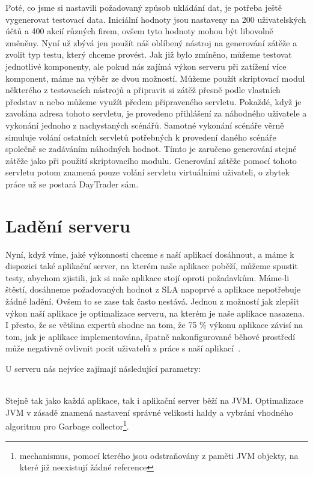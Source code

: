 \documentclass[122pt,oneside]{fithesis}
\begin{document}
Poté, co jsme si nastavili požadovaný způsob ukládání dat, je potřeba ještě vygenerovat testovací data. Iniciální hodnoty jsou nastaveny na 200 uživatelských účtů a 400 akcií různých firem, ovšem tyto hodnoty mohou být libovolně změněny. Nyní už zbývá jen použít náš oblíbený nástroj na generování zátěže a zvolit typ testu, který chceme provést. Jak již bylo zmíněno, můžeme testovat jednotlivé komponenty, ale pokud nás zajímá výkon serveru při zatížení více komponent, máme na výběr ze dvou možností. Můžeme použít skriptovací modul některého z testovacích nástrojů a připravit si zátěž přesně podle vlastních představ a nebo můžeme využít předem připraveného servletu. Pokaždé, když je zavolána adresa tohoto servletu, je provedeno přihlášení za náhodného uživatele a vykonání jednoho z nachystaných scénářů. Samotné vykonání scénáře věrně simuluje volání ostatních servletů potřebných k provedení daného scénáře společně se zadáváním náhodných hodnot. Tímto je zaručeno generování stejné zátěže jako při použití skriptovacího modulu. Generování zátěže pomocí tohoto servletu potom znamená pouze volání servletu virtuálními uživateli, o zbytek práce už se postará DayTrader sám.

\section{Ladění serveru}
Nyní, když víme, jaké výkonnosti chceme s naší aplikací dosáhnout, a máme k dispozici také aplikační server, na kterém naše aplikace poběží, můžeme spustit testy, abychom zjistili, jak si naše aplikace stojí oproti požadavkům. Máme-li štěstí, dosáhneme požadovaných hodnot z SLA napoprvé a aplikace nepotřebuje žádné ladění. Ovšem to se zase tak často nestává. Jednou z možností jak zlepšit výkon naší aplikace je optimalizace serveru, na kterém je naše aplikace nasazena. I přesto, že se většina expertů shodne na tom, že 75 \% výkonu aplikace závisí na tom, jak je aplikace implementována, špatně nakonfigurované běhové prostředí může negativně ovlivnit pocit uživatelů z práce s naší aplikací~\cite{performanceTuning}. 

U serveru nás nejvíce zajímají následující parametry:

\vspace{5 mm}
\\\indent Stejně tak jako každá aplikace, tak i aplikační server běží na JVM. Optimalizace JVM v zásadě znamená nastavení správné velikosti haldy a vybrání vhodného algoritmu pro Garbage collector\footnote[1]{mechanismus, pomocí kterého jsou odstraňovány z paměti JVM objekty, na které již neexistují žádné reference}.
\end{document}
